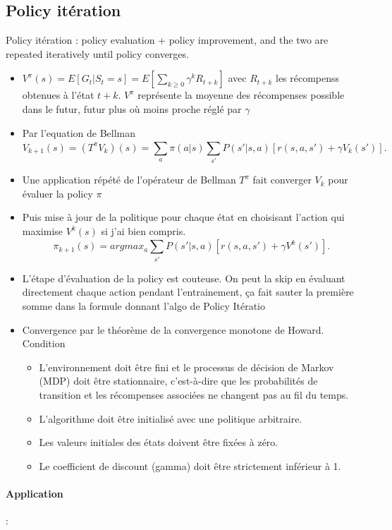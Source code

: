 \documentclass{article}
\begin{document}
\subsection{Policy itération}
Policy itération : policy evaluation + policy improvement, and the two are repeated iteratively until policy converges.
\begin{itemize}
    \item $ V^\pi (s) = E[G_t | S_t = s] = E[ \sum_{k \geq 0}^{} \gamma ^k R_{t+k}] $ avec $ R_{t+k} $ les récompenss obtenues à l'état $ t+k $. $ V^\pi $ représente la moyenne des récompenses possible dans le futur, futur plus où moins proche réglé par $ \gamma  $ 
    \item Par l'equation de Bellman
    \[
        V_{k+1}(s) = (T^\pi V_k)(s) = \sum_{a}^{}\pi (a | s) \sum_{s'}^{}P(s' | s, a) [r(s, a, s') + \gamma V_k(s')]
    .\]
    \item Une application répété de l'opérateur de Bellman $ T^\pi  $ fait converger $ V_k $ pour évaluer la policy $ \pi  $ 
    \item Puis mise à jour de la politique pour chaque état en choisisant l'action qui maximise $ V^k(s) $ si j'ai bien compris. 
    \[
        \pi _{k+1}(s) = argmax_a \sum_{s'}^{} P(s' | s, a) [ r(s, a, s') + \gamma V^{k}(s')]
    .\]
    \item L'étape d'évaluation de la policy est couteuse. On peut la skip en évaluant directement chaque action pendant l'entrainement, ça fait sauter la première somme dans la formule donnant l'algo de Policy Itératio
    \item Convergence par le théorème de la convergence monotone de Howard. Condition \begin{itemize}
        \item L'environnement doit être fini et le processus de décision de Markov (MDP) doit être stationnaire, c'est-à-dire que les probabilités de transition et les récompenses associées ne changent pas au fil du temps.
        \item L'algorithme doit être initialisé avec une politique arbitraire.
        \item Les valeurs initiales des états doivent être fixées à zéro.
        \item Le coefficient de discount (gamma) doit être strictement inférieur à 1.
    \end{itemize}
\end{itemize}


\paragraph*{Application} : 
\end{document}
